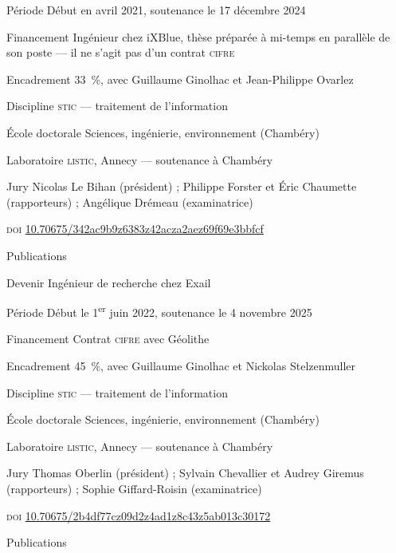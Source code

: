 \begin{cvfields}
  \item[Période] Début en avril 2021, soutenance le 17 décembre 2024
  \item[Financement] Ingénieur chez iXBlue, thèse préparée à mi-temps en
    parallèle de son poste --- il ne s'agit pas d'un contrat \textsc{cifre}
  \item[Encadrement] 33~\%, avec Guillaume Ginolhac et Jean-Philippe Ovarlez
  \item[Discipline] \textsc{stic} --- traitement de l'information
  \item[École doctorale] Sciences, ingénierie, environnement (Chambéry)
  \item[Laboratoire] \textsc{listic}, Annecy --- soutenance à Chambéry
  \item[Jury] Nicolas Le Bihan (président) ; Philippe Forster et Éric
    Chaumette (rapporteurs) ; Angélique Drémeau (examinatrice)
  \item[\textsc{doi}] \href{https://doi.org/10.70675/342ac9b9z6383z42acza2aez69f69e3bbfcf}%
    {10.70675/342ac9b9z6383z42acza2aez69f69e3bbfcf}
  \item[Publications] 
  \item[Devenir] Ingénieur de recherche chez Exail
\end{cvfields}

\begin{cvfields}
  \item[Période] Début le 1\textsuperscript{er} juin 2022, soutenance le
    4 novembre 2025
  \item[Financement] Contrat \textsc{cifre} avec Géolithe
  \item[Encadrement] 45~\%, avec Guillaume Ginolhac et Nickolas Stelzenmuller
  \item[Discipline] \textsc{stic} --- traitement de l'information
  \item[École doctorale] Sciences, ingénierie, environnement (Chambéry)
  \item[Laboratoire] \textsc{listic}, Annecy --- soutenance à Chambéry
  \item[Jury] Thomas Oberlin (président) ; Sylvain Chevallier et Audrey
    Giremus (rapporteurs) ; Sophie Giffard-Roisin (examinatrice)
  \item[\textsc{doi}] \href{https://doi.org/10.70675/2b4df77cz09d2z4ad1z8c43z5ab013c30172}%
    {10.70675/2b4df77cz09d2z4ad1z8c43z5ab013c30172}
  \item[Publications] 
\end{cvfields}

